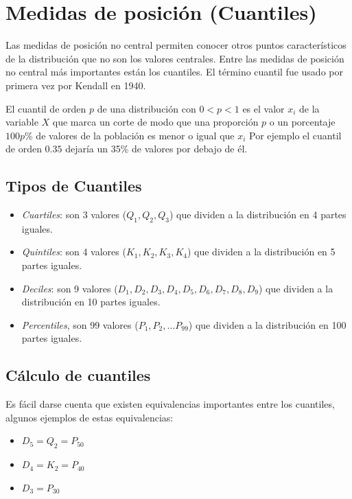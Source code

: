 \documentclass[]{book}
\providecommand{\tightlist}{%
  \setlength{\itemsep}{0pt}\setlength{\parskip}{0pt}}
\begin{document}
\hypertarget{medidas-de-posicion-cuantiles}{%
\section{Medidas de posición (Cuantiles)}\label{medidas-de-posicion-cuantiles}}

Las medidas de posición no central permiten conocer otros puntos característicos de la distribución que no son los valores centrales. Entre las medidas de posición no central más importantes están los cuantiles. El término cuantil fue usado por primera vez por Kendall en 1940.

El cuantil de orden \(p\) de una distribución con \(0<p<1\) es el valor \(x_{i}\) de la variable \(X\) que marca un corte de modo que una proporción \(p\) o un porcentaje \(100p\)\% de valores de la población es menor o igual que \(x_{i}\) Por ejemplo el cuantil de orden \(0.35\) dejaría un 35\% de valores por debajo de él.

\hypertarget{tipos-de-cuantiles}{%
\subsection{Tipos de Cuantiles}\label{tipos-de-cuantiles}}

\begin{itemize}
\item
  \emph{Cuartiles}: son 3 valores (\(Q_{1}, Q_{2}, Q_{3}\)) que dividen a la distribución en 4 partes iguales.
\item
  \emph{Quintiles}: son 4 valores (\(K_{1}, K_{2}, K_{3}, K_{4}\)) que dividen a la distribución en 5 partes iguales.
\item
  \emph{Deciles}: son 9 valores (\(D_1, D_2, D_3, D_4, D_5, D_6, D_7, D_8, D_9\)) que dividen a la distribución en 10 partes iguales.
\item
  \emph{Percentiles}, son 99 valores (\(P_1, P_2, \ldots P_{99}\)) que dividen a la distribución en 100 partes iguales.
\end{itemize}

\hypertarget{calculo-de-cuantiles}{%
\subsection{Cálculo de cuantiles}\label{calculo-de-cuantiles}}

Es fácil darse cuenta que existen equivalencias importantes entre los cuantiles, algunos ejemplos de estas equivalencias:

\begin{itemize}
\tightlist
\item
  \(D_5=Q_2=P_{50}\)
\item
  \(D_4=K_2=P_{40}\)
\item
  \(D_3=P_{30}\)
\end{itemize}
\end{document}
